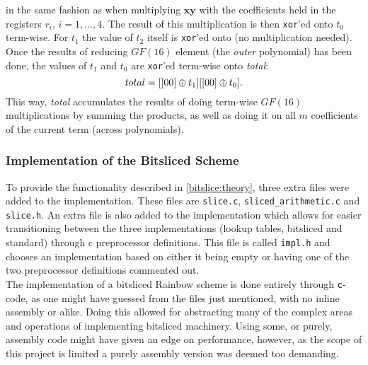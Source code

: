 in the same fashion as when multiplying $\textbf{xy}$ with the coefficients held in the registers $r_i$, $i = 1,\dots, 4$. The result of this multiplication is then \texttt{xor}'ed onto $t_0$ term-wise. For $t_1$ the value of $t_2$ itself is \texttt{xor}'ed onto (no multiplication needed).\medskip\\
Once the results of reducing $GF(16)$ element (the \textit{outer} polynomial) has been done, the values of $t_1$ and $t_0$ are \texttt{xor}'ed term-wise onto \textit{total}:
$$
    total = [[00] \oplus t_1] [[00] \oplus t_0].
$$
This way, \textit{total} accumulates the results of doing term-wise $GF(16)$ multiplications by summing the products, as well as doing it on all $m$ coefficients of the current term (across polynomials).
\subsubsection{Implementation of the Bitsliced Scheme} \label{bitslice:implementation}
To provide the functionality described in \cref{bitslice:theory}, three extra files were added to the implementation. These files are \texttt{slice.c}, \texttt{sliced\_arithmetic.c} and \texttt{slice.h}. An extra file is also added to the implementation which allows for easier transitioning between the three implementations (lookup tables, bitsliced and standard) through c preprocessor definitions. This file is called \texttt{impl.h} and chooses an implementation based on either it being empty or having one of the two preprocessor definitions commented out.
\medskip\\
The implementation of a bitsliced Rainbow scheme is done entirely through \texttt{c}-code, as one might have guessed from the files just mentioned, with no inline assembly or alike. Doing this allowed for abstracting many of the complex areas and operations of implementing bitsliced machinery. Using some, or purely, assembly code might have given an edge on performance, however, as the scope of this project is limited a purely assembly version was deemed too demanding.
